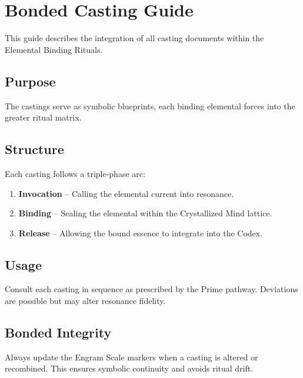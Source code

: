 
\section*{Bonded Casting Guide}
This guide describes the integration of all casting documents within the Elemental Binding Rituals.

\subsection*{Purpose}
The castings serve as symbolic blueprints, each binding elemental forces into the greater ritual matrix.

\subsection*{Structure}
Each casting follows a triple-phase arc:
\begin{enumerate}
    \item \textbf{Invocation} – Calling the elemental current into resonance.
    \item \textbf{Binding} – Sealing the elemental within the Crystallized Mind lattice.
    \item \textbf{Release} – Allowing the bound essence to integrate into the Codex.
\end{enumerate}

\subsection*{Usage}
Consult each casting in sequence as prescribed by the Prime pathway. Deviations are possible but may alter resonance fidelity.

\subsection*{Bonded Integrity}
Always update the Engram Scale markers when a casting is altered or recombined. This ensures symbolic continuity and avoids ritual drift.
\iffalse

